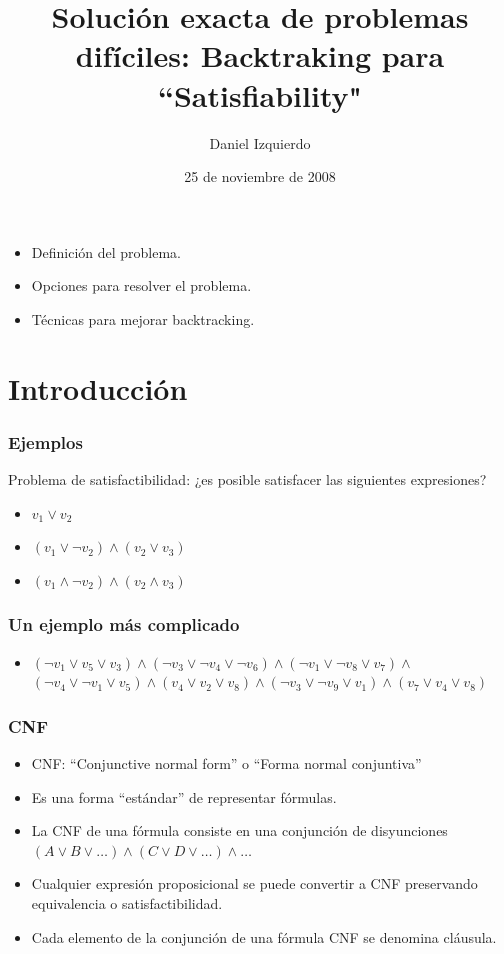 \documentclass{beamer}
\begin{document}
\title{Solución exacta de problemas difíciles: Backtraking para ``Satisfiability"}
\author{Daniel Izquierdo}
\date{25 de noviembre de 2008}

\frame{\titlepage}

\section[Contenido]{}
\frame
{
  \begin{itemize}
  \item Definición del problema.
  \item Opciones para resolver el problema.
  \item Técnicas para mejorar backtracking.
  \end{itemize}
}

\section{Introducción}

\frame
{
  \frametitle{Ejemplos}

  Problema de satisfactibilidad: ¿es posible satisfacer las siguientes expresiones?

  \begin{itemize}
  \item $v_1 \vee v_2$
  \item $(v_1 \vee \neg v_2) \wedge (v_2 \vee v_3)$
  \item $(v_1 \wedge \neg v_2) \wedge (v_2 \wedge v_3)$
  \end{itemize}
}

\frame
{
  \frametitle{Un ejemplo más complicado}

  \begin{itemize}
  \item $(\neg v_{1} \vee v_5 \vee v_3) \wedge (\neg v_{3} \vee \neg v_{4} \vee \neg v_{6}) \wedge (\neg v_{1} \vee \neg v_{8} \vee v_{7}) \wedge$
        $(\neg v_{4} \vee \neg v_{1} \vee v_{5}) \wedge (v_4 \vee v_2 \vee v_8) \wedge (\neg v_3 \vee \neg v_9 \vee v_1) \wedge (v_7 \vee v_4 \vee v_8)$
  \end{itemize}
}

\frame
{
  \frametitle{CNF}

  \begin{itemize}
  \item CNF: ``Conjunctive normal form'' o ``Forma normal conjuntiva''
  \item Es una forma ``estándar'' de representar fórmulas.
  \item La CNF de una fórmula consiste en una conjunción de disyunciones $(A \vee B \vee \ldots) \wedge (C \vee D \vee \ldots) \wedge \ldots$
  \item Cualquier expresión proposicional se puede convertir a CNF preservando
        equivalencia o satisfactibilidad.
  \item Cada elemento de la conjunción de una fórmula CNF se denomina cláusula.
  \end{itemize}
}
\end{document}
